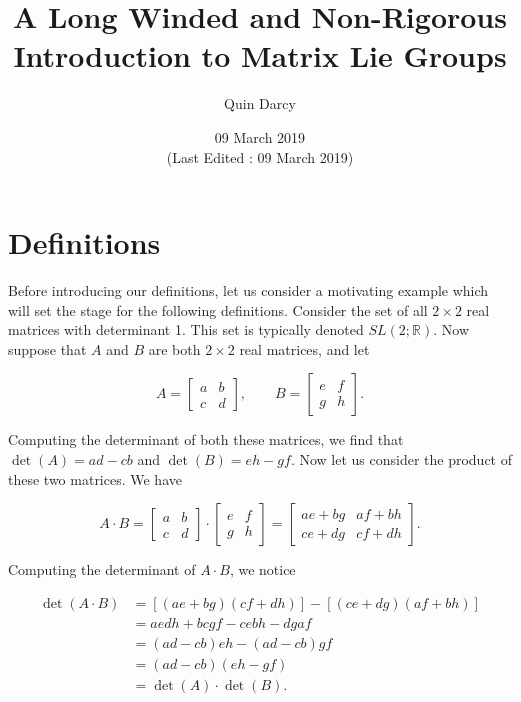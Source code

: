 \documentclass{article}
\theoremstyle{definition}
\theoremstyle{remark}
\begin{document}
\title{A Long Winded and Non-Rigorous Introduction to Matrix Lie Groups}
\author{Quin Darcy}
\date{09 March 2019\\\small{(Last Edited : 09 March 2019)}}
\maketitle

\section{Definitions}

Before introducing our definitions, let us consider a motivating example which will set the stage for the following definitions. Consider the set of all $2\times 2$ real matrices with determinant 1. This set is typically denoted $SL(2;\mathbb{R})$. Now suppose that $A$ and $B$ are both $2\times 2$ real matrices, and let

\begin{equation*}
    A=\begin{bmatrix} a & b \\ c & d \end{bmatrix}, \qquad B=\begin{bmatrix} e & f \\ g & h\end{bmatrix}.
\end{equation*}

Computing the determinant of both these matrices, we find that $\det(A)=ad-cb$ and $\det(B)=eh-gf$. Now let us consider the product of these two matrices. We have

\begin{equation*}
    A\cdot B=\begin{bmatrix} a & b\\c & d\end{bmatrix}\cdot\begin{bmatrix} e & f\\ g & h\end{bmatrix} =\begin{bmatrix} ae+bg & af+bh\\ce+dg & cf+dh\end{bmatrix}.
\end{equation*}

\noindent Computing the determinant of $A\cdot B$, we notice

\begin{equation}
    \begin{split}
        \det(A\cdot B) &= [(ae+bg)(cf+dh)]-[(ce+dg)(af+bh)] \\
        &= aedh+bcgf-cebh-dgaf \\
        &= (ad-cb)eh-(ad-cb)gf \\
        &= (ad-cb)(eh-gf) \\
        &= \det(A)\cdot\det(B).
    \end{split}
\end{equation}
\end{document}

